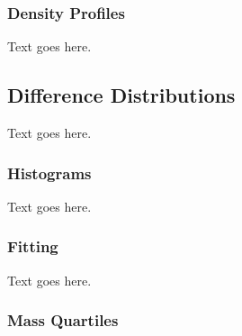 \subsubsection{Density Profiles}
\label{subsubsec:analysis--halo_comparison--density_profiles}


Text goes here.




\subsection{Difference Distributions}
\label{subsec:analysis--difference_histograms}


Text goes here.



\subsubsection{Histograms}
\label{subsubsec:analysis--difference_histograms--binning}


Text goes here.



\subsubsection{Fitting}
\label{subsubsec:analysis--difference_histograms--fitting}


Text goes here.



\subsubsection{Mass Quartiles}
\label{subsubsec:analysis--difference_histograms--mass_quartiles}


